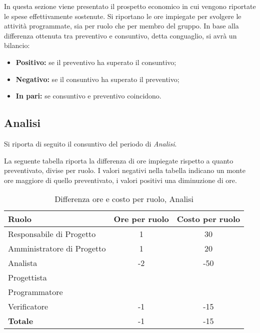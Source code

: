 In questa sezione viene presentato il prospetto economico in cui vengono riportate le spese effettivamente sostenute. Si riportano le ore impiegate per svolgere le attività programmate, sia per ruolo che per membro del gruppo. In base alla differenza ottenuta tra preventivo e consuntivo, detta conguaglio, si avrà un bilancio:
\begin{itemize}
	\item \textbf{Positivo:} se il preventivo ha superato il consuntivo; 
	\item \textbf{Negativo:} se il consuntivo ha superato il preventivo;
	\item \textbf{In pari:} se consuntivo e preventivo coincidono.
\end{itemize}

\subsection{Analisi}
Si riporta di seguito il consuntivo del periodo di \textit{Analisi}.

\noindent La seguente tabella riporta la differenza di ore impiegate rispetto a quanto preventivato, divise per ruolo. I valori negativi nella tabella indicano un monte ore maggiore di quello preventivato, i valori positivi una diminuzione di ore.

\begin{table}[h]
\centering
\begin{tabular}{|l|c|c|}
	\toprule
	\textbf{Ruolo} & \textbf{Ore per ruolo} & \textbf{Costo per ruolo} \\
	
	\midrule
	Responsabile di Progetto & 1 & 30 \\
	Amministratore di Progetto & 1 & 20 \\ 
	Analista & -2 & -50 \\
	Progettista & & \\
	Programmatore & & \\
	Verificatore & -1 & -15 \\
	\midrule
	\textbf{Totale} & -1 & -15 \\
		
	\bottomrule
\end{tabular}
\caption{Differenza ore e costo per ruolo, Analisi}
\label{tab3}
\end{table} 

